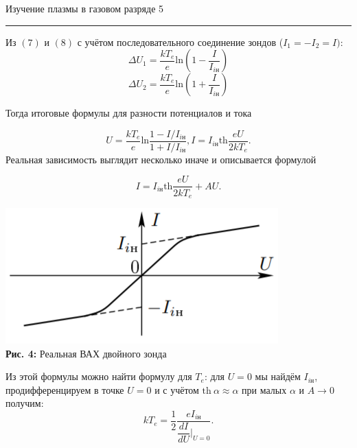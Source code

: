 \documentclass[12pt,a4paper]{scrartcl}
\begin{document}
	\newpage
	

	\begin{flushleft}
		\footnotesize{Изучение плазмы в газовом разряде} \hspace{\fill} \footnotesize{5}
		\\[-0.3cm]\noindent\rule{\textwidth}{0.3pt}
	\end{flushleft}	
	
Из $(7)$ и $(8)$ с учётом последовательного соединение зондов ($I_1 = -I_2 = I)$:
$$
\Delta U_1= \dfrac{kT_e}{e}\text{ln}\left(1 - \dfrac{I}{I_{i\text{н}}}\right)
$$
$$
\Delta U_2= \dfrac{kT_e}{e}\text{ln}\left(1 + \dfrac{I}{I_{i\text{н}}}\right)
$$

Тогда итоговые формулы для разности потенциалов и тока

\begin{equation}
U = \dfrac{kT_e}{e}\text{ln}\dfrac{1 - I/I_{i\text{н}}}{1 + I/I_{i\text{н}}}, 
I = I_{i\text{н}} \text{th}\dfrac{eU}{2kT_e}.
\end{equation}
Реальная зависимость выглядит несколько иначе и описывается формулой 

\begin{equation}
I = I_{i\text{н}} \text{th}\dfrac{eU}{2kT_e} + AU.
\end{equation}

\begin{center}
\includegraphics[scale=0.8]{PIC_4.png}
\\\textbf{Рис. 4:} Реальная ВАХ двойного зонда
\end{center}

Из этой формулы можно найти формулу для $T_e$: для $U=0$ мы найдём $I_{i\text{н}}$, продифференцируем в точке $U=0$ и с учётом $\text{th}~\alpha \approx \alpha$ при малых $\alpha$ и $A\rightarrow 0$ получим:
\begin{equation}
kT_e = \dfrac{1}{2}\dfrac{eI_{i\text{н}}}{\dfrac{dI}{dU}|_{U=0}}.
\end{equation}	
	
\end{document}
